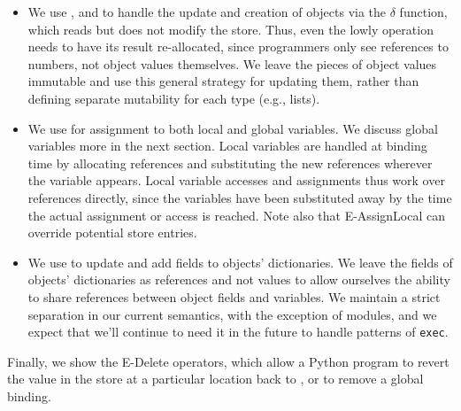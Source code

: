 \documentclass[10pt]{sigplanconf}
\newcommand{\Scribtexttt}[1]{{\texttt{#1}}}
\newlength{\stabLeft}
\newcommand{\atItemizeStart}[0]{\addtolength{\stabLeft}{\labelsep}
                                \addtolength{\stabLeft}{\labelwidth}}
\begin{document}
\begin{itemize}\atItemizeStart

\item We use ,  and 
to handle the update and creation of objects via the $\delta$ function, which
reads but does not modify the store.  Thus, even the lowly 
operation needs to have its result re{-}allocated, since programmers only see
references to numbers, not object values themselves.  We leave the pieces of
object values immutable and use this general strategy for updating them,
rather than defining separate mutability for each type (e.g., lists).

\item We use  for assignment to both local and
global variables.  We discuss global variables more in the next section.
Local variables are handled at binding time by allocating references and
substituting the new references wherever the variable appears.  Local
variable accesses and assignments thus work over references directly, since
the variables have been substituted away by the time the actual assignment or
access is reached.  Note also that E{-}AssignLocal can override potential
 store entries.

\item We use  to update and add fields to
objects{'} dictionaries.  We leave the fields of objects{'} dictionaries as
references and not values to allow ourselves the ability to share references
between object fields and variables.  We maintain a strict separation in our
current semantics, with the exception of modules, and we expect that we{'}ll
continue to need it in the future to handle patterns of \Scribtexttt{exec}.\end{itemize}

Finally, we show the E{-}Delete operators, which allow a Python program to revert
the value in the store at a particular location back to , or to remove
a global binding.
\end{document}
